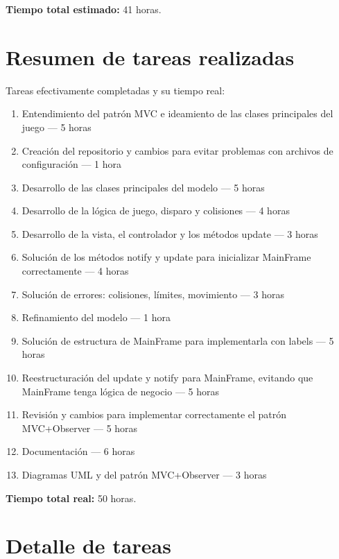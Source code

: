 \documentclass[12pt, a4paper]{article}
\begin{document}
\textbf{Tiempo total estimado:} 41 horas.

\vspace{1.5em}

\section{Resumen de tareas realizadas}

Tareas efectivamente completadas y su tiempo real:

\begin{enumerate}[leftmargin=2em]
    \item Entendimiento del patrón MVC e ideamiento de las clases principales del juego — 5 horas
    \item Creación del repositorio y cambios para evitar problemas con archivos de configuración — 1 hora
    \item Desarrollo de las clases principales del modelo — 5 horas
    \item Desarrollo de la lógica de juego, disparo y colisiones — 4 horas
    \item Desarrollo de la vista, el controlador y los métodos update — 3 horas
    \item Solución de los métodos notify y update para inicializar MainFrame correctamente — 4 horas
    \item Solución de errores: colisiones, límites, movimiento — 3 horas
    \item Refinamiento del modelo — 1 hora
    \item Solución de estructura de MainFrame para implementarla con labels — 5 horas
    \item Reestructuración del update y notify para MainFrame, evitando que MainFrame tenga lógica de negocio — 5 horas
    \item Revisión y cambios para implementar correctamente el patrón MVC+Observer — 5 horas

    \item Documentación — 6 horas
    \item Diagramas UML y del patrón MVC+Observer — 3 horas
\end{enumerate}

\textbf{Tiempo total real:} 50 horas.

\vspace{1.5em}

\section{Detalle de tareas}
\end{document}
